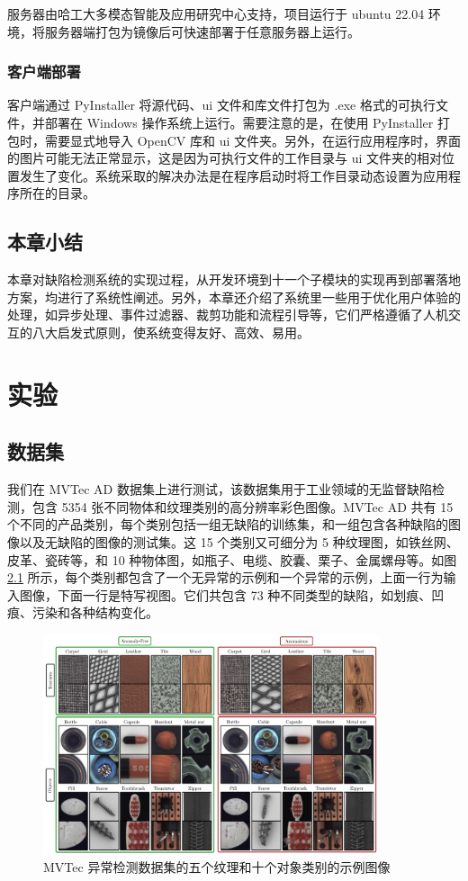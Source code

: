 \documentclass[
  ]{njuthesis}
\begin{document}
服务器由哈工大多模态智能及应用研究中心支持，项目运行于 ubuntu 22.04 环境，将服务器端打包为镜像后可快速部署于任意服务器上运行。

\subsection{客户端部署}

客户端通过 PyInstaller 将源代码、ui 文件和库文件打包为 .exe 格式的可执行文件，并部署在 Windows 操作系统上运行。需要注意的是，在使用 PyInstaller 打包时，需要显式地导入 OpenCV 库和 ui 文件夹。另外，在运行应用程序时，界面的图片可能无法正常显示，这是因为可执行文件的工作目录与 ui 文件夹的相对位置发生了变化。系统采取的解决办法是在程序启动时将工作目录动态设置为应用程序所在的目录。

\section{本章小结}

本章对缺陷检测系统的实现过程，从开发环境到十一个子模块的实现再到部署落地方案，均进行了系统性阐述。另外，本章还介绍了系统里一些用于优化用户体验的处理，如异步处理、事件过滤器、裁剪功能和流程引导等，它们严格遵循了人机交互的八大启发式原则，使系统变得友好、高效、易用。

\chapter{实验}

\section{数据集}

我们在 MVTec AD 数据集上进行测试，该数据集用于工业领域的无监督缺陷检测，包含 5354 张不同物体和纹理类别的高分辨率彩色图像。MVTec AD 共有 15 个不同的产品类别，每个类别包括一组无缺陷的训练集，和一组包含各种缺陷的图像以及无缺陷的图像的测试集。这 15 个类别又可细分为 5 种纹理图，如铁丝网、皮革、瓷砖等，和 10 种物体图，如瓶子、电缆、胶囊、栗子、金属螺母等。如图 \ref{MVTec} 所示，每个类别都包含了一个无异常的示例和一个异常的示例，上面一行为输入图像，下面一行是特写视图。它们共包含 73 种不同类型的缺陷，如划痕、凹痕、污染和各种结构变化。

\begin{figure}[htb]
    \centering
    \includegraphics[width=0.88\textwidth]{images/MVTec.png}
    \caption{MVTec 异常检测数据集的五个纹理和十个对象类别的示例图像}
    \label{MVTec}
\end{figure}
\end{document}

